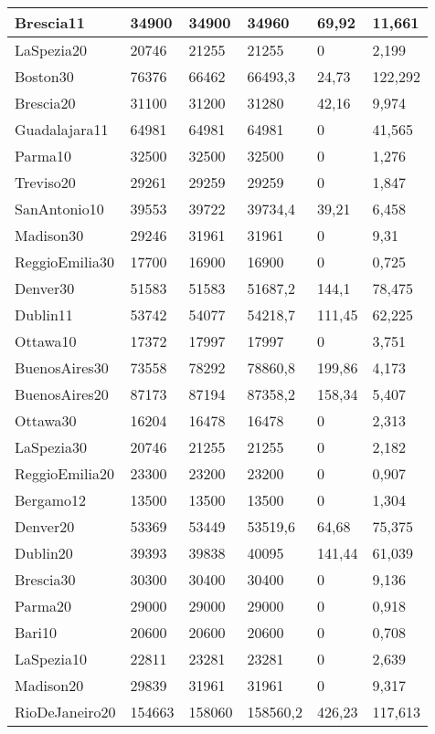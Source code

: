 \begin{longtable}[c]{|l|l|l|l|l|l|}
Brescia11 & 34900 & 34900 & 34960 & 69,92 & 11,661 \\ \hline
LaSpezia20 & 20746 & 21255 & 21255 & 0 & 2,199 \\ \hline
Boston30 & 76376 & 66462 & 66493,3 & 24,73 & 122,292 \\ \hline
Brescia20 & 31100 & 31200 & 31280 & 42,16 & 9,974 \\ \hline
Guadalajara11 & 64981 & 64981 & 64981 & 0 & 41,565 \\ \hline
Parma10 & 32500 & 32500 & 32500 & 0 & 1,276 \\ \hline
Treviso20 & 29261 & 29259 & 29259 & 0 & 1,847 \\ \hline
SanAntonio10 & 39553 & 39722 & 39734,4 & 39,21 & 6,458 \\ \hline
Madison30 & 29246 & 31961 & 31961 & 0 & 9,31 \\ \hline
ReggioEmilia30 & 17700 & 16900 & 16900 & 0 & 0,725 \\ \hline
Denver30 & 51583 & 51583 & 51687,2 & 144,1 & 78,475 \\ \hline
Dublin11 & 53742 & 54077 & 54218,7 & 111,45 & 62,225 \\ \hline
Ottawa10 & 17372 & 17997 & 17997 & 0 & 3,751 \\ \hline
BuenosAires30 & 73558 & 78292 & 78860,8 & 199,86 & 4,173 \\ \hline
BuenosAires20 & 87173 & 87194 & 87358,2 & 158,34 & 5,407 \\ \hline
Ottawa30 & 16204 & 16478 & 16478 & 0 & 2,313 \\ \hline
LaSpezia30 & 20746 & 21255 & 21255 & 0 & 2,182 \\ \hline
ReggioEmilia20 & 23300 & 23200 & 23200 & 0 & 0,907 \\ \hline
Bergamo12 & 13500 & 13500 & 13500 & 0 & 1,304 \\ \hline
Denver20 & 53369 & 53449 & 53519,6 & 64,68 & 75,375 \\ \hline
Dublin20 & 39393 & 39838 & 40095 & 141,44 & 61,039 \\ \hline
Brescia30 & 30300 & 30400 & 30400 & 0 & 9,136 \\ \hline
Parma20 & 29000 & 29000 & 29000 & 0 & 0,918 \\ \hline
Bari10 & 20600 & 20600 & 20600 & 0 & 0,708 \\ \hline
LaSpezia10 & 22811 & 23281 & 23281 & 0 & 2,639 \\ \hline
Madison20 & 29839 & 31961 & 31961 & 0 & 9,317 \\ \hline
RioDeJaneiro20 & 154663 & 158060 & 158560,2 & 426,23 & 117,613 \\ \hline
\end{longtable}